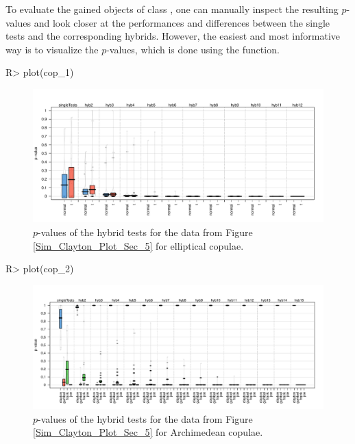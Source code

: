 \bk To evaluate the gained \mycolor objects \bk of class , one can manually inspect the resulting $p$-values and look closer at the performances and differences between the single tests and the corresponding hybrids. However, the easiest and most informative way is to visualize the $p$-values, which is done using the  function.
\mycolor
\begin{example}
R> plot(cop_1)
\end{example}
\vspace{-1cm}
\begin{figure}[H]
	\centering
 \includegraphics[width=\textwidth]{img/Simulation_cop1.pdf}
	\caption{\mycolor $p$-values of the hybrid tests for the data from Figure \ref{Sim_Clayton_Plot_Sec_5} for elliptical copulae.}
	\label{fig:Sim_cop1}
\end{figure}

\begin{example}
R> plot(cop_2)
\end{example}
\vspace{-1cm}
\begin{figure}[H]
	\centering
 \includegraphics[width=\textwidth]{img/Simulation_cop2.pdf}
	\caption{\mycolor $p$-values of the hybrid tests for the data from Figure \ref{Sim_Clayton_Plot_Sec_5} for Archimedean copulae.}
	\label{fig:Sim_cop2}
\end{figure}


